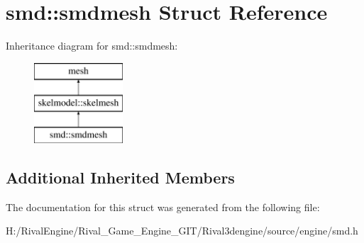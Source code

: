 \hypertarget{structsmd_1_1smdmesh}{}\section{smd\+:\+:smdmesh Struct Reference}
\label{structsmd_1_1smdmesh}
Inheritance diagram for smd\+:\+:smdmesh\+:\begin{figure}[H]
\begin{center}
\leavevmode
\includegraphics[height=3.000000cm]{structsmd_1_1smdmesh}
\end{center}
\end{figure}
\subsection*{Additional Inherited Members}


The documentation for this struct was generated from the following file\+:\begin{DoxyCompactItemize}
\item 
H\+:/\+Rival\+Engine/\+Rival\+\_\+\+Game\+\_\+\+Engine\+\_\+\+G\+I\+T/\+Rival3dengine/source/engine/smd.\+h\end{DoxyCompactItemize}

